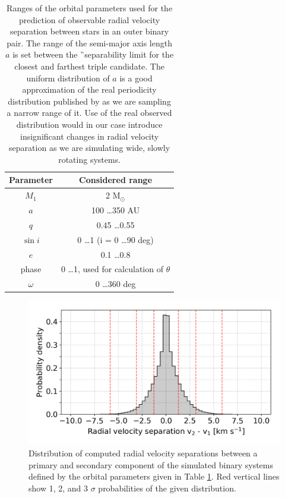 \begin{table}
	\centering
	\caption{Ranges of the orbital parameters used for the prediction of observable radial velocity separation between stars in an outer binary pair. The range of the semi-major axis length $a$ is set between the \G\ separability limit for the closest and farthest triple candidate. The uniform distribution of $a$ is a good approximation of the real periodicity distribution published by \citet{2010ApJS..190....1R} as we are sampling a narrow range of it. Use of the real observed distribution would in our case introduce insignificant changes in radial velocity separation as we are simulating wide, slowly rotating systems.}
	\begin{tabular}{c | c}
		\hline
		Parameter & Considered range \\ 
		\hline
		$M_1$ & 2 M$_{\odot}$ \\
		$a$ & 100 \ldots 350 AU \\
		$q$ & 0.45 \ldots 0.55 \\
		$\sin i$ & 0 \ldots 1 (i = 0 \ldots 90 deg)\\
		$e$ & 0.1 \ldots 0.8 \\
		phase & 0 \ldots 1, used for calculation of $\theta$ \\
		$\omega$ & 0 \ldots 360 deg \\
		\hline
	\end{tabular}
	\label{tab:mc_gaia}
\end{table}

\begin{figure}
	\centering
	\includegraphics[width=\columnwidth]{MC_rv_from_sep_outer.png}
	\caption{Distribution of computed radial velocity separations between a primary and secondary component of the simulated binary systems defined by the orbital parameters given in Table \ref{tab:mc_gaia}. Red vertical lines show 1, 2, and 3 $\sigma$ probabilities of the given distribution.}
	\label{fig:mc_rv_sep}
\end{figure}

